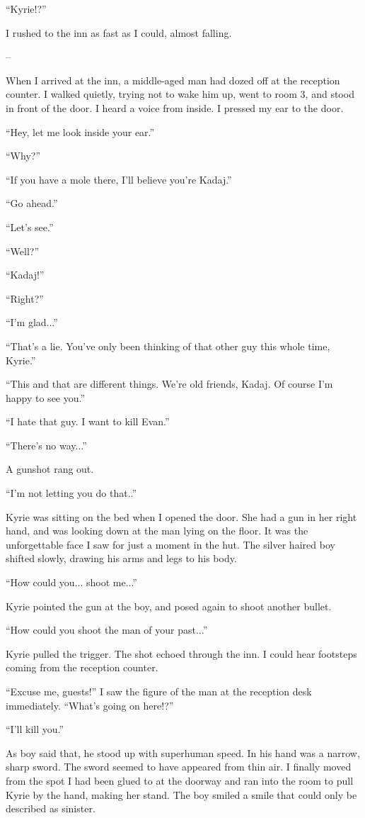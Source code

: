 \documentclass[oneside]{book}
\begin{document}
“Kyrie!?”

I rushed to the inn as fast as I could, almost falling.

–

When I arrived at the inn, a middle-aged man had dozed off at the reception counter. I walked quietly, trying not to wake him up, went to room 3, and stood in front of the door. I heard a voice from inside. I pressed my ear to the door.

“Hey, let me look inside your ear.”

“Why?”

“If you have a mole there, I’ll believe you’re Kadaj.”

“Go ahead.”

“Let’s see.”

“Well?”

“Kadaj!”

“Right?”

“I’m glad...”

“That’s a lie. You’ve only been thinking of that other guy this whole time, Kyrie.”

“This and that are different things. We’re old friends, Kadaj. Of course I’m happy to see you.”

“I hate that guy. I want to kill Evan.”

“There’s no way...”

A gunshot rang out.

“I’m not letting you do that..”

Kyrie was sitting on the bed when I opened the door. She had a gun in her right hand, and was looking down at the man lying on the floor. It was the unforgettable face I saw for just a moment in the hut. The silver haired boy shifted slowly, drawing his arms and legs to his body.

“How could you... shoot me...”

Kyrie pointed the gun at the boy, and posed again to shoot another bullet.

“How could you shoot the man of your past...”

Kyrie pulled the trigger. The shot echoed through the inn. I could hear footsteps coming from the reception counter.

“Excuse me, guests!” I saw the figure of the man at the reception desk immediately. “What’s going on here!?”

“I’ll kill you.”

As boy said that, he stood up with superhuman speed. In his hand was a narrow, sharp sword. The sword seemed to have appeared from thin air. I finally moved from the spot I had been glued to at the doorway and ran into the room to pull Kyrie by the hand, making her stand. The boy smiled a smile that could only be described as sinister.
\end{document}
